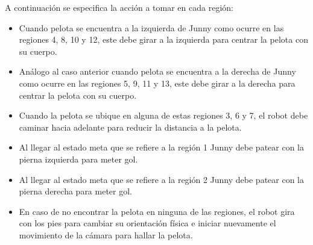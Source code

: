 A continuación se especifica la acción a tomar en cada regi\'on: 
 \begin{itemize}
\item Cuando pelota se encuentra a la izquierda de Junny como ocurre en las regiones 4, 8, 10 y 12, este debe girar a la izquierda para centrar la pelota con su cuerpo.

\item An\'alogo al caso anterior cuando pelota se encuentra a la derecha de Junny como ocurre en las regiones  5, 9, 11 y 13, este debe girar a la derecha para centrar la pelota con su cuerpo.

\item Cuando la pelota se ubique en alguna de estas regiones 3, 6 y 7, el robot debe caminar hacia adelante para reducir la distancia a la pelota.

\item Al llegar al estado meta que se refiere a la regi\'on 1 Junny debe patear con la pierna izquierda para meter gol.

\item Al llegar al estado meta que se refiere a la regi\'on 2 Junny debe patear con la pierna derecha para meter gol.

\item En caso de no encontrar la pelota en ninguna de las regiones, el robot gira con los pies para cambiar su orientación física e iniciar nuevamente el movimiento de la cámara para hallar la pelota. 

\end{itemize}
